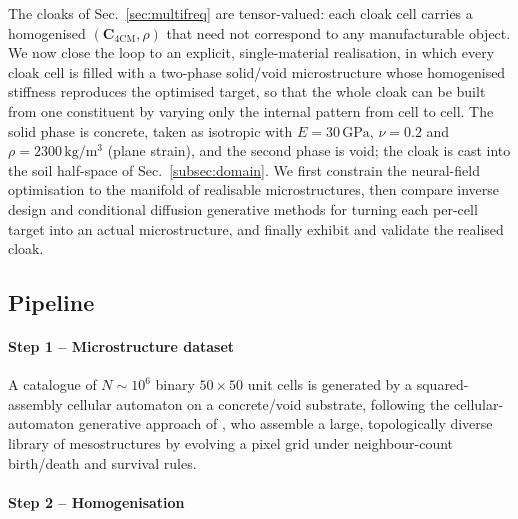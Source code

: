 \documentclass[preprint,12pt]{elsarticle}
\newcommand{\mbf}[1]{\mathbf{#1}}
\begin{document}
The cloaks of Sec.~\ref{sec:multifreq} are tensor-valued: each cloak cell
carries a homogenised $(\mbf{C}_{\mathrm{4CM}},\rho)$ that need not correspond to
any manufacturable object. We now close the loop to an explicit, single-material
realisation, in which every cloak cell is filled with a two-phase solid/void
microstructure whose homogenised stiffness reproduces the optimised target, so
that the whole cloak can be built from one constituent by varying only the
internal pattern from cell to cell. The solid phase is concrete, taken as
isotropic with $E=30\,\text{GPa}$, $\nu=0.2$ and
$\rho=2300\,\text{kg}/\text{m}^3$ (plane strain), and the second phase is void;
the cloak is cast into the soil half-space of
Sec.~\ref{subsec:domain}. We first constrain the neural-field
optimisation to the manifold of realisable microstructures, then compare inverse design and conditional diffusion generative methods for turning
each per-cell target into an actual microstructure, and finally exhibit and
validate the realised cloak.

\subsection{Pipeline}\label{subsec:micro_pipeline}

\paragraph{Step 1 -- Microstructure dataset} A catalogue of $N\sim10^{6}$
binary $50\times50$ unit cells is generated by a squared-assembly cellular
automaton on a concrete/void substrate, following the cellular-automaton
generative approach of \citet{nakarmi2024}, who assemble a large,
topologically diverse library of mesostructures by evolving a pixel grid
under neighbour-count birth/death and survival rules.

\paragraph{Step 2 -- Homogenisation} 

\end{document}
